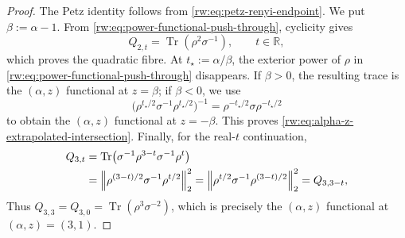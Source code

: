 \documentclass[11pt]{article}
\theoremstyle{remark}
\newcommand{\1}{\mathbbm{1}}
\begin{document}
\begin{proof}
The Petz identity follows from
\eqref{rw:eq:petz-renyi-endpoint}.  We put $\beta:=\alpha-1$.  From
\eqref{rw:eq:power-functional-push-through}, cyclicity gives
\begin{equation}
 Q_{2,t}=\operatorname{Tr}(\rho^2\sigma^{-1}),
 \qquad t\in\mathbb R,
 \label{rw:eq:real-t-quadratic-identity}
\end{equation}
which proves the quadratic fibre.  At
$t_\star:=\alpha/\beta$, the exterior power of $\rho$ in
\eqref{rw:eq:power-functional-push-through} disappears.  If
$\beta>0$, the resulting trace is the $(\alpha,z)$ functional at
$z=\beta$; if $\beta<0$, we use
\begin{equation}
 \bigl(\rho^{t_\star/2}\sigma^{-1}
       \rho^{t_\star/2}\bigr)^{-1}
 =\rho^{-t_\star/2}\sigma\rho^{-t_\star/2}
 \label{rw:eq:negative-branch-inversion}
\end{equation}
to obtain the $(\alpha,z)$ functional at $z=-\beta$.  This proves
\eqref{rw:eq:alpha-z-extrapolated-intersection}.  Finally, for the
real-$t$ continuation,
\begin{align}
 Q_{3,t}
 &=\operatorname{Tr}\!\left(
   \sigma^{-1}\rho^{3-t}\sigma^{-1}\rho^t\right)\notag\\
 &=\left\|\rho^{(3-t)/2}\sigma^{-1}\rho^{t/2}\right\|_2^2
 =\left\|\rho^{t/2}\sigma^{-1}\rho^{(3-t)/2}\right\|_2^2
 =Q_{3,3-t},
 \label{rw:eq:cubic-reflection}
\end{align}
Thus $Q_{3,3}=Q_{3,0}=\operatorname{Tr}(\rho^3\sigma^{-2})$, which
is precisely the $(\alpha,z)$ functional at $(\alpha,z)=(3,1)$.


\end{proof}
\end{document}
